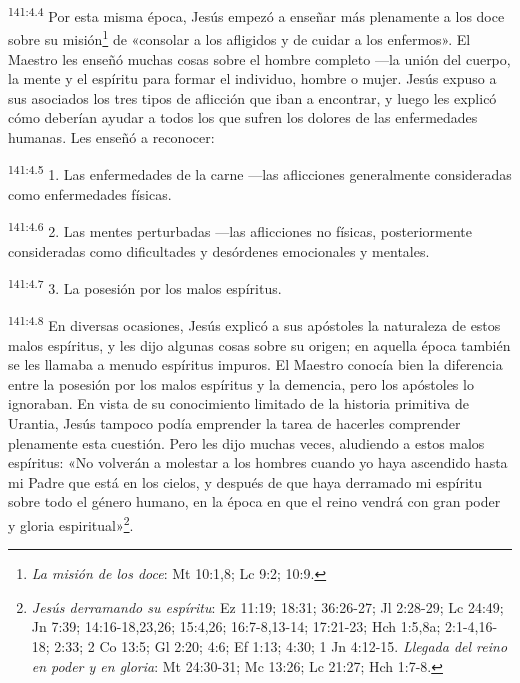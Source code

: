 \par
\textsuperscript{141:4.4} Por esta misma época, Jesús empezó a enseñar más plenamente a los doce sobre su misión\footnote{\textit{La misión de los doce}: Mt 10:1,8; Lc 9:2; 10:9.} de «consolar a los afligidos y de cuidar a los enfermos». El Maestro les enseñó muchas cosas sobre el hombre completo ---la unión del cuerpo, la mente y el espíritu para formar el individuo, hombre o mujer. Jesús expuso a sus asociados los tres tipos de aflicción que iban a encontrar, y luego les explicó cómo deberían ayudar a todos los que sufren los dolores de las enfermedades humanas. Les enseñó a reconocer:

\par
\textsuperscript{141:4.5} 1. Las enfermedades de la carne ---las aflicciones generalmente consideradas como enfermedades físicas.

\par
\textsuperscript{141:4.6} 2. Las mentes perturbadas ---las aflicciones no físicas, posteriormente consideradas como dificultades y desórdenes emocionales y mentales.

\par
\textsuperscript{141:4.7} 3. La posesión por los malos espíritus.

\par
\textsuperscript{141:4.8} En diversas ocasiones, Jesús explicó a sus apóstoles la naturaleza de estos malos espíritus, y les dijo algunas cosas sobre su origen; en aquella época también se les llamaba a menudo espíritus impuros. El Maestro conocía bien la diferencia entre la posesión por los malos espíritus y la demencia, pero los apóstoles lo ignoraban. En vista de su conocimiento limitado de la historia primitiva de Urantia, Jesús tampoco podía emprender la tarea de hacerles comprender plenamente esta cuestión. Pero les dijo muchas veces, aludiendo a estos malos espíritus: «No volverán a molestar a los hombres cuando yo haya ascendido hasta mi Padre que está en los cielos, y después de que haya derramado mi espíritu sobre todo el género humano, en la época en que el reino vendrá con gran poder y gloria espiritual»\footnote{\textit{Jesús derramando su espíritu}: Ez 11:19; 18:31; 36:26-27; Jl 2:28-29; Lc 24:49; Jn 7:39; 14:16-18,23,26; 15:4,26; 16:7-8,13-14; 17:21-23; Hch 1:5,8a; 2:1-4,16-18; 2:33; 2 Co 13:5; Gl 2:20; 4:6; Ef 1:13; 4:30; 1 Jn 4:12-15. \textit{Llegada del reino en poder y en gloria}: Mt 24:30-31; Mc 13:26; Lc 21:27; Hch 1:7-8.}.

